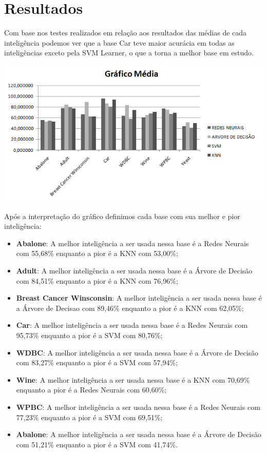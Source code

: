 \section{Resultados}
\label{sec:introducao}

Com base nos testes realizados em relação aos resultados das médias de cada inteligência podemos ver que a base Car teve maior acurácia em todas as inteligências exceto pela SVM Learner, o que a torna a melhor base em estudo.

\begin{center}
      \includegraphics[scale=1.0]{imagens/media.png}
\end{center}

Após a interpretação do gráfico definimos cada base com sua melhor e pior inteligência:

\begin{itemize}
    \item \textbf{Abalone}: A melhor inteligência a ser usada nessa base é a Redes Neurais com 55,68\% enquanto a pior é a KNN com 53,00\%;
    \item \textbf{Adult}: A melhor inteligência a ser usada nessa base é a Árvore de Decisão com 84,51\% enquanto a pior é a KNN com 76,96\%;
    \item \textbf{Breast Cancer Winsconsin}: A melhor inteligência a ser usada nessa base é a Árvore de Decisao com 89,46\% enquanto a pior é a KNN com 62,05\%;
    \item \textbf{Car}: A melhor inteligência a ser usada nessa base é a Redes Neurais com 95,73\% enquanto a pior é a SVM com 80,76\%;
    \item \textbf{WDBC}: A melhor inteligência a ser usada nessa base é a Árvore de Decisão com 83,27\% enquanto a pior é a SVM com 57,94\%;
    \item \textbf{Wine}: A melhor inteligência a ser usada nessa base é a KNN com 70,69\% enquanto a pior é a Redes Neurais com 60,60\%;
    \item \textbf{WPBC}: A melhor inteligência a ser usada nessa base é a Redes Neurais com 77,23\% enquanto a pior é a SVM com 69,51\%;
    \item \textbf{Abalone}: A melhor inteligência a ser usada nessa base é a Árvore de Decisão com 51,21\% enquanto a pior é a SVM com 41,74\%.
\end{itemize}
